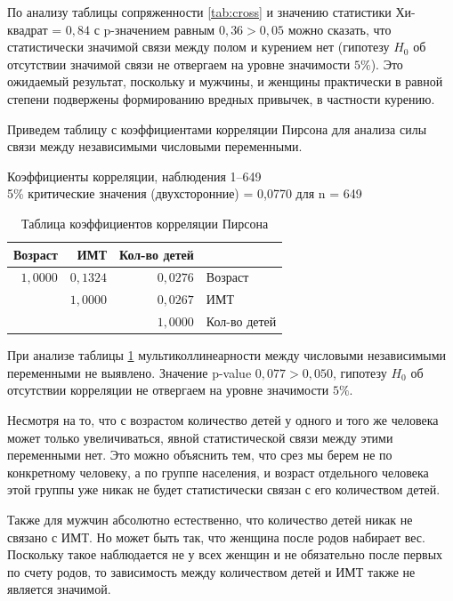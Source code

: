 \documentclass[a4paper,12pt]{article}
\begin{document}
По анализу таблицы сопряженности \ref{tab:cross} и значению статистики Хи-квадрат = $0,84$ с p-значением равным $0,36 > 0,05$ можно сказать, что статистически значимой связи между полом и курением нет (гипотезу $H_0$ об отсутствии значимой связи не отвергаем на уровне значимости $5\%$). Это ожидаемый результат, поскольку и мужчины, и женщины практически в равной степени подвержены формированию вредных привычек, в частности курению.

Приведем таблицу с коэффициентами корреляции Пирсона для анализа силы связи между независимыми числовыми переменными. 

\begin{table}[H]
\begin{center}
	Коэффициенты корреляции, наблюдения 1--649\\
	5\% критические значения (двухсторонние) = 0,0770 для n = 649\\
	\vspace{8pt}
	\begin{tabular}{|r|r|r|l|}
		\hline
		Возраст & ИМТ & Кол-во детей &\\
		\hline
		$1,0000$ & $0,1324$ & $0,0276$ & Возраст\\
		\hline
		& $1,0000$ & $0,0267$ & ИМТ\\
		\hline
		&  & $1,0000$ & Кол-во детей\\
		\hline
	\end{tabular}
	\caption{Таблица коэффициентов корреляции Пирсона}
	\label{tab:pris}
\end{center}
\end{table}

При анализе таблицы \ref{tab:pris} мультиколлинеарности между числовыми независимыми переменными не выявлено. Значение p-value $0,077 > 0,050$, гипотезу $H_0$ об отсутствии корреляции не отвергаем на уровне значимости $5\%$.

Несмотря на то, что с возрастом количество детей у одного и того же человека может только увеличиваться, явной статистической связи между этими переменными нет. Это можно объяснить тем, что срез мы берем не по конкретному человеку, а по группе населения, и возраст отдельного человека этой группы уже никак не будет статистически связан с его количеством детей. 

Также для мужчин абсолютно естественно, что количество детей никак не связано с ИМТ. Но может быть так, что женщина после родов набирает вес. Поскольку такое наблюдается не у всех женщин и не обязательно после первых по счету родов, то зависимость между количеством детей и ИМТ также не является значимой.
\end{document}
